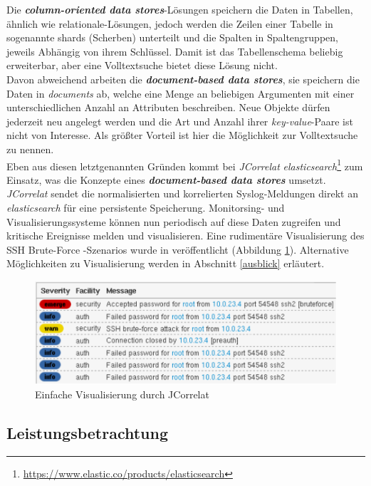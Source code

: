 Die \textbf{\emph{column-oriented data stores}}-Lösungen speichern die Daten in Tabellen, 
ähnlich wie relationale-Lösungen, jedoch werden die Zeilen einer Tabelle in sogenannte 
shards (Scherben) unterteilt und die Spalten in Spaltengruppen, jeweils Abhängig von 
ihrem Schlüssel. Damit ist das Tabellenschema beliebig erweiterbar, aber eine 
Volltextsuche bietet diese Lösung nicht.\\

Davon abweichend arbeiten die \textbf{\emph{document-based data stores}}, sie speichern 
die Daten in \textit{documents} ab, welche eine Menge an beliebigen Argumenten mit einer 
unterschiedlichen Anzahl an Attributen beschreiben. Neue Objekte dürfen jederzeit neu 
angelegt werden und die Art und Anzahl ihrer \textit{key-value}-Paare ist nicht von 
Interesse. Als größter Vorteil ist hier die Möglichkeit zur Volltextsuche zu nennen.\\

Eben aus diesen letztgenannten Gründen kommt bei \textit{JCorrelat} 
\textit{elasticsearch}\footnote{\url{https://www.elastic.co/products/elasticsearch}} zum 
Einsatz, was die Konzepte eines \textbf{\emph{document-based data stores}} umsetzt. 
\textit{JCorrelat} sendet die normalisierten und korrelierten Syslog-Meldungen direkt an 
\textit{elasticsearch} für eine persistente Speicherung. Monitorsing- und 
Visualisierungssysteme können nun periodisch auf diese Daten zugreifen und kritische 
Ereignisse melden und visualisieren. Eine rudimentäre Visualisierung des SSH Brute-Force 
-Szenarios wurde in \cite{reissmann} veröffentlicht (Abbildung \ref{pic:logvis}). 
Alternative Möglichkeiten zu Visualisierung werden in Abschnitt \ref{ausblick} erläutert. 

\begin{figure}[htbp]
    \caption{Einfache Visualisierung durch JCorrelat}
    \label{pic:logvis}\vspace{0.2cm}
    \centering
    \includegraphics[scale=0.42]{img/correlat-ui}  
\end{figure}
\newpage
\subsection{Leistungsbetrachtung}\label{performance}

